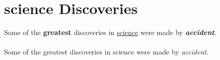 \documentclass{article}
\begin{document}
	\section{science Discoveries}
		Some of the \textbf{greatest}
		discoveries in \underline{science} were made by 
		\textbf{\textit{accident}}.
		
		\paragraph{}
		Some of the greatest discoveries in science were made by \emph{accident}.
		
\end{document}
